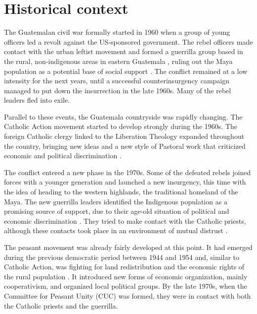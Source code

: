 \documentclass[12pt, notitlepage]{article}
\begin{document}
\section*{Historical context}

The Guatemalan civil war formally started in 1960 when a group of young officers led a revolt against the US-sponsored government.
The rebel officers made contact with the urban leftist movement and formed a guerrilla group based in the rural, non-indigenous areas in eastern Guatemala \citep{Arias:1992aa}, ruling out the Maya population as a potential base of social support \citep{Smith:1990ab}.
The conflict remained at a low intensity for the next years, until a successful counterinsurgency campaign managed to put down the insurrection in the late 1960s.
Many of the rebel leaders fled into exile.

Parallel to these events, the Guatemala countryside was rapidly changing.
The Catholic Action movement started to develop strongly during the 1960s.
The foreign Catholic clergy linked to the Liberation Theology expanded throughout the country, bringing new ideas and a new style of Pastoral work that criticized economic and political discrimination \citep{Arias:1992aa, Nelson:2009aa, Stoll:1999aa}.

The conflict entered a new phase in the 1970s.
Some of the defeated rebels joined forces with a younger generation and launched a new insurgency, this time with the idea of heading to the western highlands, the traditional homeland of the Maya.
The new guerrilla leaders identified the Indigenous population as a promising source of support, due to their age-old situation of political and economic discrimination \citep{Payeras:1981aa, Arias:1992aa}.
They tried to make contact with the Catholic priests, although these contacts took place in an environment of mutual distrust \citep[e.g.][]{Manz:2004aa}.

The peasant movement was already fairly developed at this point.
It had emerged during the previous democratic period between 1944 and 1954 and, similar to Catholic Action, was fighting for land redistribution and the economic rights of the rural population \citep{Handy:1994aa, Forster:2001aa}.
It introduced new forms of economic organization, mainly cooperativism, and organized local political groups.
By the late 1970s, when the Committee for Peasant Unity (CUC) was formed, they were in contact with both the Catholic priests and the guerrilla.
\end{document}
